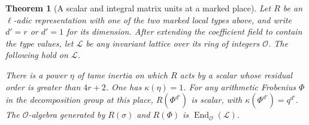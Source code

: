 \documentclass[a4paper,11pt]{article}
\newtheorem{theorem}[proposition]{Theorem}
\theoremstyle{definition}
\theoremstyle{remark}
\numberwithin{equation}{section}
\begin{document}
\begin{theorem}[A scalar and integral matrix units at a marked place]
\leavevmode\label{thm:markedmatrix715}
Let \(R\) be an \(\ell\)-adic representation with one of the
two marked local types above, and write \(d'=r\) or \(d'=1\)
for its dimension. After extending the coefficient field to
contain the type values, let \(\mathcal L\) be any invariant
lattice over its ring of integers \(\mathcal O\). The following
hold on \(\mathcal L\).

There is a power \(\eta\) of tame inertia on which \(R\) acts
by a scalar whose residual order is greater than \(4r+2\).
One has \(\kappa(\eta)=1\). For any arithmetic Frobenius
\(\Phi\) in the decomposition group at this place,
\(R(\Phi^{d'})\) is scalar, with
\(\kappa(\Phi^{d'})=q^{d'}\). The \(\mathcal O\)-algebra
generated by \(R(\sigma)\) and \(R(\Phi)\) is
\(\operatorname{End}_{\mathcal O}(\mathcal L)\).
\end{theorem}
\end{document}
